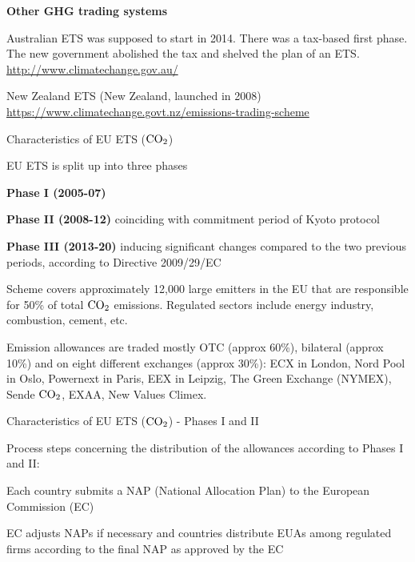 	\textbf{Other GHG trading systems}

	Australian ETS was supposed to start in 2014. There was a  tax-based first phase. The new government abolished the tax and shelved the plan of an ETS.
        \url{http://www.climatechange.gov.au/}

	New Zealand ETS (New Zealand, launched in 2008)
        \url{https://www.climatechange.govt.nz/emissions-trading-scheme}


{Characteristics of EU ETS ($\textnormal{CO}_2$)}

	EU ETS is split up into three phases

	\textbf{Phase I (2005-07)}

	\textbf{Phase II (2008-12)} coinciding with commitment period of Kyoto protocol

	\textbf{Phase III (2013-20)} inducing significant changes compared to the two previous periods, according to Directive 2009/29/EC

	Scheme covers approximately 12,000 large emitters in the EU that are responsible for 50\% of total $\textnormal{CO}_2$ emissions. Regulated sectors include energy industry, combustion, cement, etc.

	Emission allowances are traded mostly OTC (approx 60\%), bilateral (approx 10\%) and on eight different exchanges (approx 30\%):
  ECX in London, Nord Pool in Oslo, Powernext in Paris, EEX in Leipzig, The Green Exchange (NYMEX), Sende $\textnormal{CO}_2$, EXAA, New Values Climex.

{Characteristics of EU ETS ($\textnormal{CO}_2$) - Phases I and II}

	Process steps concerning the distribution of the allowances according to Phases I and II:

	Each country submits a NAP (National Allocation Plan) to the European Commission (EC)

	EC adjusts NAPs if necessary and countries distribute EUAs among regulated firms according to the final NAP as approved by the EC

